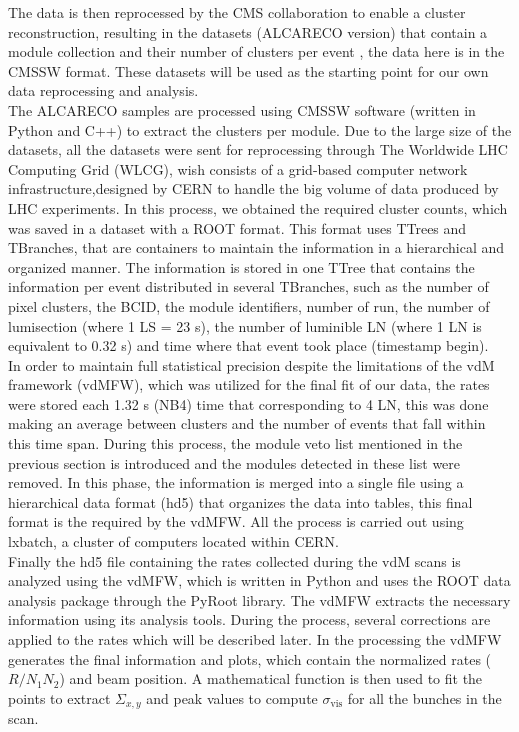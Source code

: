 The data is then reprocessed by the CMS collaboration to enable a cluster reconstruction, resulting in the datasets (ALCARECO version) that contain a module collection and their number of clusters per event , the data here is in the CMSSW format. These datasets will be used as the starting point for our own data reprocessing and analysis.\\

The ALCARECO samples are processed using CMSSW software (written in Python and C++) to extract the clusters per module. Due to the large size of the datasets, all the datasets were sent for reprocessing through The Worldwide LHC Computing Grid (WLCG), wish consists of a grid-based computer network infrastructure,designed by CERN to handle the big volume of data produced by LHC experiments. In this  process, we obtained the required cluster counts, which was saved in a dataset with a ROOT format. This format uses TTrees and TBranches, that are containers to maintain the information in a hierarchical and organized manner. 
The information is stored in one TTree that contains the information per event distributed in several TBranches, such as the number of pixel clusters, the BCID, the module identifiers, number of run, the number of lumisection (where 1 LS = 23 s), the number of luminible LN (where 1 LN is equivalent to 0.32 s) and time where that event took place (timestamp begin).\\

In order to maintain full statistical precision despite the limitations of the vdM framework (vdMFW), which was utilized for the final fit of our data, the rates were stored  each 1.32 s (NB4) time that corresponding to 4 LN, this was done making  an average  between clusters and the number of events that fall within this time span. During this process, the module veto list mentioned in the previous section is introduced and the modules detected in these list were removed. In this phase, the information is merged into a single file using a hierarchical data format (hd5) that organizes the data into tables, this final format is the required by the vdMFW. All the  process is carried out using lxbatch, a cluster of computers located within CERN.\\

Finally the hd5 file containing the rates collected during the vdM scans  is analyzed using the vdMFW, which is written in Python and uses the ROOT data analysis package through the PyRoot library. The vdMFW  extracts the necessary information using its analysis tools. During the process, several corrections are applied to the rates which will be described later. In the processing the vdMFW generates the final information and plots, which contain the normalized rates ($R/N_{1}N_{2}$) and beam position.  A mathematical function is then used to fit the points to extract $\Sigma_{x,y}$ and peak values to compute $\sigma_{\text{vis}}$ for all the bunches in the scan.

